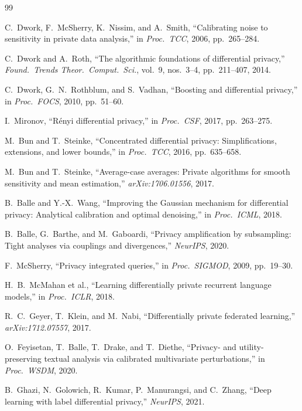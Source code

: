 \documentclass[12pt]{article}
\begin{document}
\begin{thebibliography}{99}

C.~Dwork, F.~McSherry, K.~Nissim, and A.~Smith,
``Calibrating noise to sensitivity in private data analysis,''
in \textit{Proc.\ TCC}, 2006, pp.~265--284.

C.~Dwork and A.~Roth,
``The algorithmic foundations of differential privacy,''
\textit{Found.\ Trends Theor.\ Comput.\ Sci.}, vol.~9, nos.~3--4,
pp.~211--407, 2014.

C.~Dwork, G.~N.\ Rothblum, and S.~Vadhan,
``Boosting and differential privacy,''
in \textit{Proc.\ FOCS}, 2010, pp.~51--60.

I.~Mironov,
``Rényi differential privacy,''
in \textit{Proc.\ CSF}, 2017, pp.~263--275.

M.~Bun and T.~Steinke,
``Concentrated differential privacy: Simplifications, extensions, and lower
bounds,''
in \textit{Proc.\ TCC}, 2016, pp.~635--658.

M.~Bun and T.~Steinke,
``Average-case averages: Private algorithms for smooth sensitivity and mean
estimation,''
\textit{arXiv:1706.01556}, 2017.

B.~Balle and Y.-X.\ Wang,
``Improving the Gaussian mechanism for differential privacy: Analytical
calibration and optimal denoising,''
in \textit{Proc.\ ICML}, 2018.

B.~Balle, G.~Barthe, and M.~Gaboardi,
``Privacy amplification by subsampling: Tight analyses via couplings and
divergences,''
\textit{NeurIPS}, 2020.

F.~McSherry,
``Privacy integrated queries,''
in \textit{Proc.\ SIGMOD}, 2009, pp.~19--30.

H.~B.\ McMahan et al.,
``Learning differentially private recurrent language models,''
in \textit{Proc.\ ICLR}, 2018.

R.~C.\ Geyer, T.~Klein, and M.~Nabi,
``Differentially private federated learning,''
\textit{arXiv:1712.07557}, 2017.

O.~Feyisetan, T.~Balle, T.~Drake, and T.~Diethe,
``Privacy- and utility-preserving textual analysis via calibrated multivariate
perturbations,''
in \textit{Proc.\ WSDM}, 2020.

B.~Ghazi, N.~Golowich, R.~Kumar, P.~Manurangsi, and C.~Zhang,
``Deep learning with label differential privacy,''
\textit{NeurIPS}, 2021.

\end{thebibliography}
\end{document}

